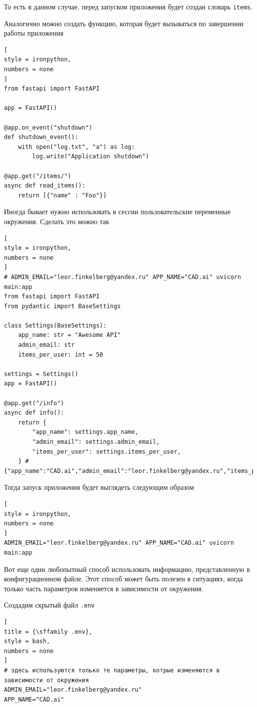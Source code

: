 \documentclass[%
	11pt,
	a4paper,
	utf8,
		]{article}
\begin{document}
То есть в данном случае, перед запуском приложения будет создан словарь \texttt{items}.

Аналогично можно создать функцию, которая будет вызываться по завершении работы приложения
\begin{lstlisting}[
style = ironpython,
numbers = none	
]
from fastapi import FastAPI

app = FastAPI()

@app.on_event("shutdown")
def shutdown_event():
    with open("log.txt", "a") as log:
        log.write("Application shutdown")
        
@app.get("/items/")
async def read_items():
    return [{"name" : "Foo"}]
\end{lstlisting}

Иногда бывает нужно использовать в сессии пользовательские переменные окружения. Сделать это можно так
\begin{lstlisting}[
style = ironpython,
numbers = none
]
# ADMIN_EMAIL="leor.finkelberg@yandex.ru" APP_NAME="CAD.ai" uvicorn main:app
from fastapi import FastAPI
from pydantic import BaseSettings

class Settings(BaseSettings):
    app_name: str = "Awesome API"
    admin_email: str
    items_per_user: int = 50

settings = Settings()
app = FastAPI()

@app.get("/info")
async def info():
    return {	
    	"app_name": settings.app_name,
    	"admin_email": settings.admin_email,
    	"items_per_user": settings.items_per_user,
    } # {"app_name":"CAD.ai","admin_email":"leor.finkelberg@yandex.ru","items_per_user":50}
\end{lstlisting}

Тогда запуск приложения будет выглядеть следующим образом
\begin{lstlisting}[
style = ironpython,
numbers = none	
]
ADMIN_EMAIL="leor.finkelberg@yandex.ru" APP_NAME="CAD.ai" uvicorn main:app
\end{lstlisting} 

Вот еще один любопытный способ использовать информацию, представленную в конфигурационном файле. Этот способ может быть полезен в ситуациях, когда только часть параметров изменяется в зависимости от окружения.

Создадим скрытый файл \texttt{.env}
\begin{lstlisting}[
title = {\sffamily .env},
style = bash,
numbers = none	
]
# здесь используются только те параметры, котрые изменяются в зависимости от окружения
ADMIN_EMAIL="leor.finkelberg@yandex.ru"
APP_NAME="CAD.ai"
\end{lstlisting}
\end{document}
